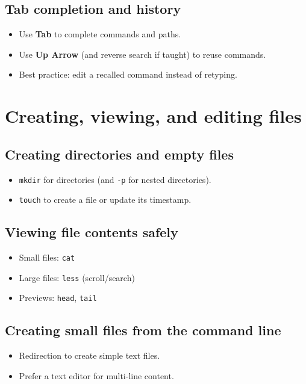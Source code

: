 \subsection{Tab completion and history}
\begin{itemize}
\item Use \textbf{Tab} to complete commands and paths.
\item Use \textbf{Up Arrow} (and reverse search if taught) to reuse commands.
\item Best practice: edit a recalled command instead of retyping.
\end{itemize}

\section{Creating, viewing, and editing files}
\subsection{Creating directories and empty files}
\begin{itemize}
\item \texttt{mkdir} for directories (and \texttt{-p} for nested directories).
\item \texttt{touch} to create a file or update its timestamp.
\end{itemize}

\subsection{Viewing file contents safely}
\begin{itemize}
\item Small files: \texttt{cat}
\item Large files: \texttt{less} (scroll/search)
\item Previews: \texttt{head}, \texttt{tail}
\end{itemize}

\subsection{Creating small files from the command line}
\begin{itemize}
\item Redirection to create simple text files.
\item Prefer a text editor for multi-line content.
\end{itemize}

